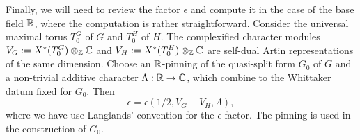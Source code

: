 \documentclass{article}
\theoremstyle{definition}
\numberwithin{equation}{section}
\renewcommand{\-}{\hyp{}}
\begin{document}




Finally, we will need to review the factor $\epsilon$ and compute it in the case of the base field $\mathbb{R}$, where the computation is rather straightforward. Consider the universal maximal torus $T_0^G$ of $G$ and $T_0^H$ of $H$. The complexified character modules $V_G := X^*(T_0^G)\otimes_{\mathbb{Z}}\mathbb{C}$ and $V_H := X^*(T_0^H)\otimes_{\mathbb{Z}}\mathbb{C}$ are self-dual Artin representations of the same dimension. Choose an $\mathbb{R}$-pinning of the quasi-split form $G_0$ of $G$ and a non-trivial additive character $\Lambda : \mathbb{R} \to \mathbb{C}$, which combine to the Whittaker datum fixed for $G_0$. Then
\[ \epsilon = \epsilon(1/2,V_G-V_H,\Lambda), \]
where we have use Langlands' convention \cite[(3.6.4)]{TateCor} for the $\epsilon$-factor. The pinning is used in the construction of $G_0$.
\end{document}
